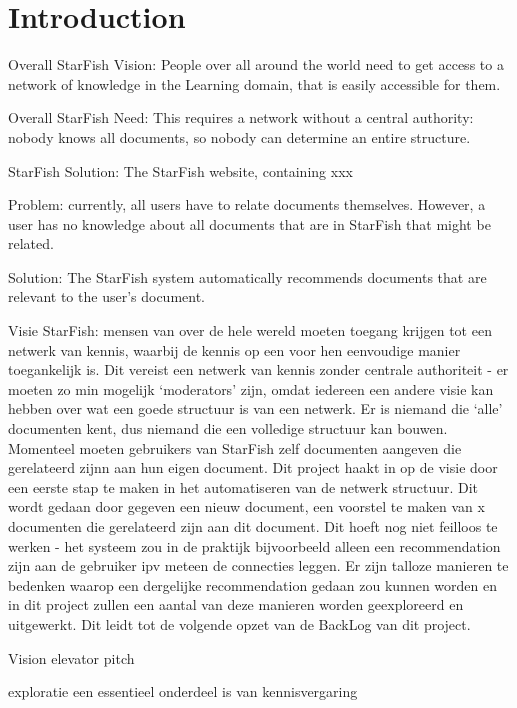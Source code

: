 
\section{Introduction}

Overall StarFish Vision: People over all around the world need to get access to a network of knowledge in the Learning domain, that is easily accessible for them.

Overall StarFish Need: This requires a network without a central authority: nobody knows all documents, so nobody can determine an entire structure.

StarFish Solution: The StarFish website, containing xxx

Problem: currently, all users have to relate documents themselves. However, a user has no knowledge about all documents that are in StarFish that might be related. 

Solution: The StarFish system automatically recommends documents that are relevant to the user’s document. 

Visie StarFish: mensen van over de hele wereld moeten toegang krijgen tot een netwerk van kennis, waarbij de kennis op een voor hen eenvoudige manier toegankelijk is. Dit vereist een netwerk van kennis zonder centrale authoriteit - er moeten zo min mogelijk ‘moderators’ zijn, omdat iedereen een andere visie kan hebben over wat een goede structuur is van een netwerk. Er is niemand die ‘alle’ documenten kent, dus niemand die een volledige structuur kan bouwen. 
 	Momenteel moeten gebruikers van StarFish zelf documenten aangeven die gerelateerd zijnn aan hun eigen document. Dit project haakt in op de visie door een eerste stap te maken in het automatiseren van de netwerk structuur. Dit wordt gedaan door gegeven een nieuw document, een voorstel te maken van x documenten die gerelateerd zijn aan dit document. Dit hoeft nog niet feilloos te werken - het systeem zou in de praktijk bijvoorbeeld alleen een recommendation zijn aan de gebruiker ipv meteen de connecties leggen. 
 	Er zijn talloze manieren te bedenken waarop een dergelijke recommendation gedaan zou kunnen worden en in dit project zullen een aantal van deze manieren worden geexploreerd en uitgewerkt. Dit leidt tot de volgende opzet van de BackLog van dit project. 

Vision elevator pitch

exploratie een essentieel onderdeel is van kennisvergaring

